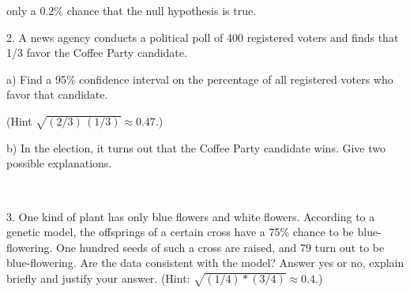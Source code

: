 \documentclass[10pt]{article}
\newcommand{\HH}{\hspace{20pt} \hphantom{a)} }
\begin{document}
\HH only a $0.2$\% chance that the null hypothesis is true.
\vspace{.5in}

2. A news agency conducts a political poll of 400 registered voters and finds that
  1/3 favor the Coffee Party candidate.  

\hspace{20pt} a) Find a 95\% confidence interval on 
  the percentage of all registered voters who favor that candidate.\vspace{-4pt}

\HH (Hint $\sqrt{(2/3)\,(1/3)}\approx 0.47$.)
\vspace{2in}

\hspace{20pt} b) In the election, it turns out that the Coffee Party candidate wins.
Give two possible explanations.

\vfill
\eject
{\ }

3. One kind of plant has only blue flowers and white flowers.  According to a 
genetic model, the offsprings of a certain cross have a 75\% chance
to be blue-flowering.  One hundred seeds of such a cross are raised, and
79 turn out to be blue-flowering.  Are the data consistent with the model?  
Answer yes or no,  explain briefly and justify your 
answer. (Hint:  $\sqrt{(1/4)*(3/4)} \approx 0.4$.)
\vfill
\eject
\end{document}
